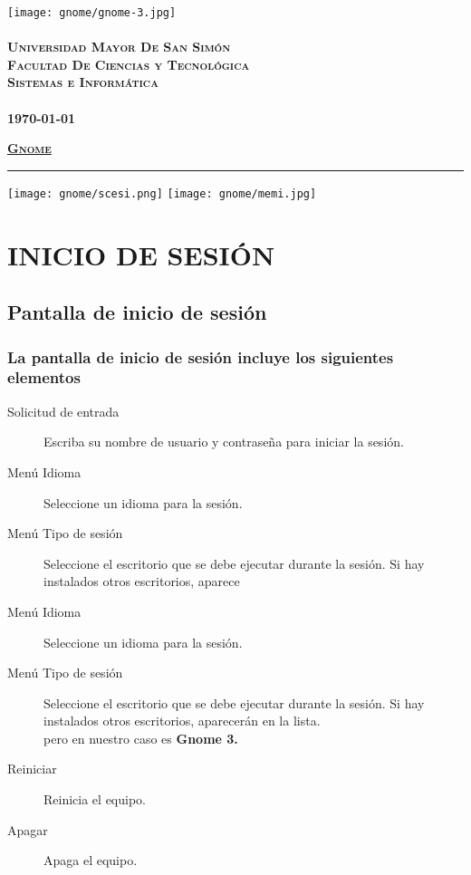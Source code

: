 \documentclass[12pt,letterpaper]{book}
\begin{document}
 \begin{titlepage}
	\thispagestyle{empty}
	\begin{center}
		\texttt{[image: gnome/gnome-3.jpg]} \\
		~\\
		\Large{\textsc{\bf Universidad Mayor De San Simón}}\\
		\large{\textsc{\bf Facultad De Ciencias y Tecnológica}}\\
		\large{\textsc{\bf Sistemas e Informática}}\\
		~\\
		\small{\bf \today}
	\end{center}
 	\vfill
	\begin{center}
		\Huge{\underline{\textsc{\bf Gnome}}}
	\end{center}
	\vfill
	\vfill
	\hrule
	\vspace{0.2cm}
	\noindent\small{\texttt{[image: gnome/scesi.png]} \hfill \texttt{[image: gnome/memi.jpg]}}
\end{titlepage}
\tableofcontents
\part{INICIO DE SESIÓN}
\chapter{Pantalla de inicio de sesión}
\section{La pantalla de inicio de sesión incluye los siguientes elementos}
\begin{description}
\item[Solicitud de entrada] Escriba su nombre de usuario y contraseña para iniciar la sesión.
\item[Menú Idioma] Seleccione un idioma para la sesión.
\item [Menú Tipo de sesión] Seleccione el escritorio que se debe ejecutar durante la sesión. Si hay instalados otros escritorios, aparece
\item[Menú Idioma] Seleccione un idioma para la sesión.
\item [Menú Tipo de sesión] Seleccione el escritorio que se debe ejecutar durante la sesión. Si hay instalados otros escritorios, aparecerán en la lista.\\ pero en nuestro caso es {\bf Gnome 3.}
\item[Reiniciar] Reinicia el equipo.
\item[Apagar] Apaga el equipo.
\end{description}
\end{document}
